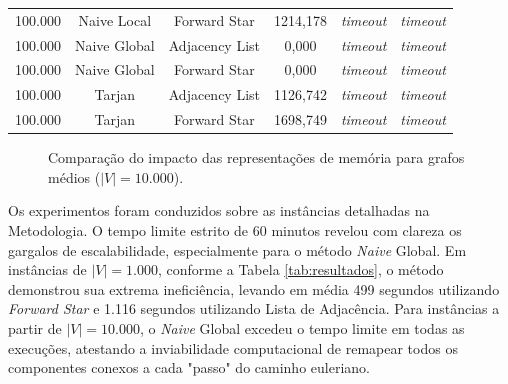 \documentclass[12pt]{article}
\begin{document}
\begin{table}[ht]
\begin{tabular}{cccccc}
100.000 & Naive Local    & Forward Star   & 1214,178 & \textit{timeout}  & \textit{timeout} \\
100.000 & Naive Global   & Adjacency List & 0,000    & \textit{timeout}  & \textit{timeout} \\
100.000 & Naive Global   & Forward Star   & 0,000    & \textit{timeout}  & \textit{timeout} \\
100.000 & Tarjan	        & Adjacency List & 1126,742 & \textit{timeout}  & \textit{timeout} \\
100.000 & Tarjan	        & Forward Star   & 1698,749 & \textit{timeout}  & \textit{timeout} \\
\hline
\end{tabular}
\end{table}

\begin{figure}[htbp]
    \centering
    \caption{Comparação do impacto das representações de memória para grafos médios ($|V| = 10.000$).}
    \label{fig:medium-rep}
\end{figure}

Os experimentos foram conduzidos sobre as instâncias detalhadas na Metodologia. O tempo limite estrito de 60 minutos revelou com clareza os gargalos de escalabilidade, especialmente para o método \textit{Naive} Global. Em instâncias de $|V| = 1.000$, conforme a Tabela \ref{tab:resultados}, o método demonstrou sua extrema ineficiência, levando em média 499 segundos utilizando \textit{Forward Star} e 1.116 segundos utilizando Lista de Adjacência. Para instâncias a partir de $|V| = 10.000$, o \textit{Naive} Global excedeu o tempo limite em todas as execuções, atestando a inviabilidade computacional de remapear todos os componentes conexos a cada "passo" do caminho euleriano.
\end{document}
